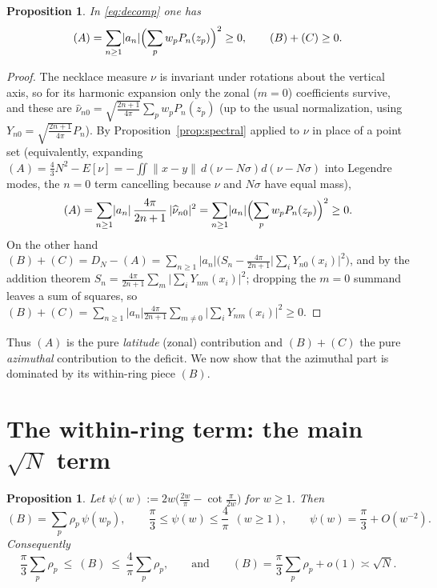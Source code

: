 \documentclass[11pt,reqno]{amsart}
\newtheorem{proposition}[theorem]{Proposition}
\theoremstyle{definition}
\newcommand{\Leg}{P}                      %
\newcommand{\dist}[2]{\lVert #1-#2\rVert}
\newcommand{\abs}[1]{\lvert #1\rvert}
\newcommand{\Def}{D_N}
\newcommand{\rp}{\rho}
\begin{document}
\begin{proposition}\label{prop:signs}
In \eqref{eq:decomp} one has
\[
   (A)=\sum_{n\ge1}\abs{a_n}\Bigl(\sum_p w_p\Leg_n(z_p)\Bigr)^2\ge0,
   \qquad (B)+(C)\ge0 .
\]
\end{proposition}

\begin{proof}
The necklace measure $\nu$ is invariant under rotations about the vertical axis, so for its harmonic
expansion only the zonal ($m=0$) coefficients survive, and these are
$\widehat{\nu}_{n0}=\sqrt{\tfrac{2n+1}{4\pi}}\sum_p w_p\Leg_n(z_p)$ (up to the usual normalization,
using $Y_{n0}=\sqrt{\tfrac{2n+1}{4\pi}}\Leg_n$). By Proposition~\ref{prop:spectral} applied to $\nu$
in place of a point set (equivalently, expanding
$(A)=\tfrac43N^2-E[\nu]=-\iint\dist{x}{y}\,d(\nu-N\sigma)d(\nu-N\sigma)$ into Legendre modes, the
$n=0$ term cancelling because $\nu$ and $N\sigma$ have equal mass),
\[
   (A)=\sum_{n\ge1}\abs{a_n}\,\frac{4\pi}{2n+1}\,\abs{\widehat\nu_{n0}}^2
      =\sum_{n\ge1}\abs{a_n}\Bigl(\sum_p w_p\Leg_n(z_p)\Bigr)^2\ge0 .
\]
On the other hand $(B)+(C)=\Def-(A)=\sum_{n\ge1}\abs{a_n}\bigl(S_n-\frac{4\pi}{2n+1}
\abs{\sum_iY_{n0}(x_i)}^2\bigr)$, and by the addition theorem
$S_n=\frac{4\pi}{2n+1}\sum_{m}\abs{\sum_iY_{nm}(x_i)}^2$; dropping the $m=0$ summand leaves a sum of
squares, so $(B)+(C)=\sum_{n\ge1}\abs{a_n}\frac{4\pi}{2n+1}\sum_{m\ne0}
\abs{\sum_iY_{nm}(x_i)}^2\ge0$.
\end{proof}

Thus $(A)$ is the pure \emph{latitude} (zonal) contribution and $(B)+(C)$ the pure
\emph{azimuthal} contribution to the deficit. We now show that the azimuthal part is dominated by
its within-ring piece $(B)$.

\section{The within-ring term: the main \texorpdfstring{$\sqrt N$}{sqrt N} term}\label{sec:within}

\begin{proposition}\label{prop:within}
Let $\psi(w):=2w\bigl(\frac{2w}{\pi}-\cot\frac{\pi}{2w}\bigr)$ for $w\ge1$. Then
\[
   (B)=\sum_p \rp_p\,\psi(w_p),\qquad \frac{\pi}{3}\le\psi(w)\le\frac{4}{\pi}\ \ (w\ge1),\qquad
   \psi(w)=\frac{\pi}{3}+O(w^{-2}).
\]
Consequently
\[
   \frac{\pi}{3}\sum_p\rp_p\ \le\ (B)\ \le\ \frac{4}{\pi}\sum_p\rp_p,
   \qquad\text{and}\qquad
   (B)=\frac{\pi}{3}\sum_p\rp_p+o(1)\asymp\sqrt N .
\]
\end{proposition}
\end{document}
